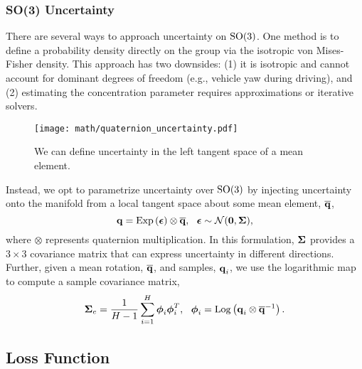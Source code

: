 \subsubsection{SO(3) Uncertainty}


There are several ways to approach uncertainty on $\mathrm{SO}(3)$. One method \citep{Carlone2015-aq} is to define a probability density directly on the group via the isotropic von Mises-Fisher density. This approach has two downsides: (1) it is isotropic and cannot account for dominant  degrees of freedom (e.g., vehicle yaw during driving), and (2) estimating the concentration parameter requires approximations or iterative solvers.

\begin{wrapfigure}{r}{0.35\textwidth}
  \vspace{-20pt}
  \begin{center}
	\texttt{[image: math/quaternion\_uncertainty.pdf]}
  \end{center}
    \vspace{-20pt}
	\label{fig:math_quat_uncertainty}
	\caption{We can define uncertainty in the left tangent space of a mean element.}
\end{wrapfigure} 
Instead, we opt to parametrize uncertainty over $\mathrm{SO}(3)$ by injecting uncertainty onto the manifold \citep{Forster2015-af,Barfoot2014-ac,Barfoot2017-ri} from a local tangent space about some mean element, $\overline{\boldsymbol{\mathbf{q}}}$,
\begin{equation}
\label{eq:quat_inject_density}
\boldsymbol{\mathbf{q}} = \mathrm{Exp}\left({\boldsymbol{\mathbf{\epsilon}}}\right) \otimes \overline{\boldsymbol{\mathbf{q}}}, ~~ \boldsymbol{\mathbf{\epsilon}} \sim \mathcal{N}(\boldsymbol{\mathbf{0}}, \boldsymbol{\mathbf{\Sigma}}),
\end{equation}
 \noindent where $\otimes$ represents quaternion multiplication. In this formulation, $\boldsymbol{\mathbf{\Sigma}}$ provides a $3\times 3$ covariance matrix that can express uncertainty in different directions. Further, given a mean rotation, $\overline{\boldsymbol{\mathbf{q}}}$, and samples, $\boldsymbol{\mathbf{q}}_i$, we use the logarithmic map to compute a sample covariance matrix,\begin{equation}
\label{eq:head_covariance}
\boldsymbol{\mathbf{\Sigma}}_e = \frac{1}{H-1} \sum_{i=1}^H  \boldsymbol{\mathbf{\phi}}_i \boldsymbol{\mathbf{\phi}}_i^T, ~~ \boldsymbol{\mathbf{\phi}}_i = \mathrm{Log}\left({\boldsymbol{\mathbf{q}}_i \otimes \overline{\boldsymbol{\mathbf{q}}}^{-1}}\right).
\end{equation}


\subsection{Loss Function}

